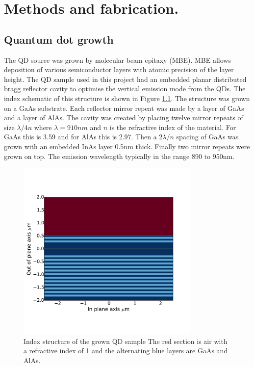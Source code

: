 
\chapter{Methods and fabrication.}

\section{Quantum dot growth}

The QD source was grown by molecular beam epitaxy (MBE). MBE allows deposition
of various semiconductor layers with atomic precision of the layer height. The
QD sample used in this project had an embedded planar distributed bragg
reflector cavity to optimise the vertical emission mode from the QDs. The index
schematic of this structure is shown in Figure \ref{fig:planar_cav}. The
structure was grown on a GaAs substrate. Each reflector mirror repeat was made
by a layer of GaAs and a layer of AlAs. The cavity was created by placing twelve
mirror repeats of size $\lambda/4n$ where $\lambda = 910nm$ and $n$ is the
refractive index of the material. For GaAs this is 3.59 and for AlAs this is
2.97. Then a $2\lambda/n$ spacing of GaAs was grown with an embedded InAs layer
0.5nm thick. Finally two mirror repeats were grown on top. The emission
wavelength typically in the range 890 to 950nm.

\begin{figure}[h!] \begin{center}
\includegraphics[width=0.8\textwidth]{images/qd_layers.pdf} \end{center}
\caption{Index structure of the grown QD sample The red section is air with a
refractive index of 1 and the alternating blue layers are GaAs and AlAs.}
\label{fig:planar_cav} \end{figure}

